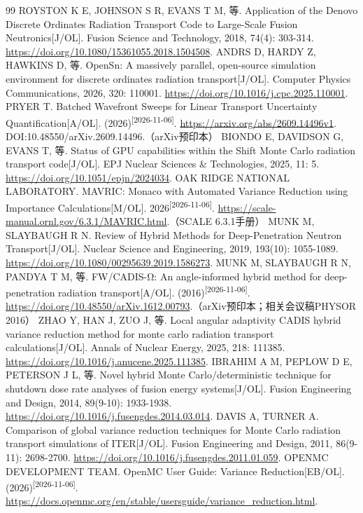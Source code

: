 \documentclass[UTF8, zihao=-4, fontset=none, a4paper]{ctexart}
\newcommand{\upcite}[1]{\textsuperscript{[#1]}}
\begin{document}
\begin{thebibliography}{99}
 ROYSTON K E, JOHNSON S R, EVANS T M, 等. Application of the Denovo Discrete Ordinates Radiation Transport Code to Large-Scale Fusion Neutronics{[}J/OL{]}. Fusion Science and Technology, 2018, 74(4): 303-314. \url{https://doi.org/10.1080/15361055.2018.1504508}.
 ANDRS D, HARDY Z, HAWKINS D, 等. OpenSn: A massively parallel, open-source simulation environment for discrete ordinates radiation transport{[}J/OL{]}. Computer Physics Communications, 2026, 320: 110001. \url{https://doi.org/10.1016/j.cpc.2025.110001}.
 PRYER T. Batched Wavefront Sweeps for Linear Transport Uncertainty Quantification{[}A/OL{]}. (2026)\upcite{2026-11-06}. \url{https://arxiv.org/abs/2609.14496v1}. DOI:10.48550/arXiv.2609.14496.（arXiv预印本）
 BIONDO E, DAVIDSON G, EVANS T, 等. Status of GPU capabilities within the Shift Monte Carlo radiation transport code{[}J/OL{]}. EPJ Nuclear Sciences \& Technologies, 2025, 11: 5. \url{https://doi.org/10.1051/epjn/2024034}.
 OAK RIDGE NATIONAL LABORATORY. MAVRIC: Monaco with Automated Variance Reduction using Importance Calculations{[}M/OL{]}. 2026\upcite{2026-11-06}. \url{https://scale-manual.ornl.gov/6.3.1/MAVRIC.html}.（SCALE 6.3.1手册）
 MUNK M, SLAYBAUGH R N. Review of Hybrid Methods for Deep-Penetration Neutron Transport{[}J/OL{]}. Nuclear Science and Engineering, 2019, 193(10): 1055-1089. \url{https://doi.org/10.1080/00295639.2019.1586273}.
 MUNK M, SLAYBAUGH R N, PANDYA T M, 等. FW/CADIS-Ω: An angle-informed hybrid method for deep-penetration radiation transport{[}A/OL{]}. (2016)\upcite{2026-11-06}. \url{https://doi.org/10.48550/arXiv.1612.00793}.（arXiv预印本；相关会议稿PHYSOR 2016）
 ZHAO Y, HAN J, ZUO J, 等. Local angular adaptivity CADIS hybrid variance reduction method for monte carlo radiation transport calculations{[}J/OL{]}. Annals of Nuclear Energy, 2025, 218: 111385. \url{https://doi.org/10.1016/j.anucene.2025.111385}.
 IBRAHIM A M, PEPLOW D E, PETERSON J L, 等. Novel hybrid Monte Carlo/deterministic technique for shutdown dose rate analyses of fusion energy systems{[}J/OL{]}. Fusion Engineering and Design, 2014, 89(9-10): 1933-1938. \url{https://doi.org/10.1016/j.fusengdes.2014.03.014}.
 DAVIS A, TURNER A. Comparison of global variance reduction techniques for Monte Carlo radiation transport simulations of ITER{[}J/OL{]}. Fusion Engineering and Design, 2011, 86(9-11): 2698-2700. \url{https://doi.org/10.1016/j.fusengdes.2011.01.059}.
 OPENMC DEVELOPMENT TEAM. OpenMC User Guide: Variance Reduction{[}EB/OL{]}. (2026)\upcite{2026-11-06}. \url{https://docs.openmc.org/en/stable/usersguide/variance_reduction.html}.

\end{thebibliography}
\end{document}
